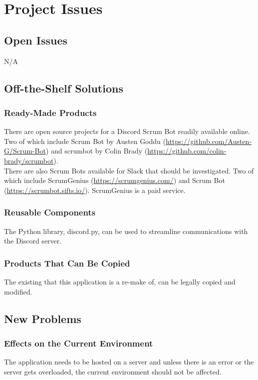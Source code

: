 \documentclass[12pt, titlepage]{article}
\begin{document}
\section{Project Issues}
\subsection{Open Issues}
N/A

\subsection{Off-the-Shelf Solutions}
\subsubsection{Ready-Made Products}
\noindent There are open source projects for a Discord Scrum Bot readily available online. Two of which include Scrum Bot by Austen Goddu (\url{https://github.com/Austen-G/Scrum-Bot}) and scrumbot by Colin Brady (\url{https://github.com/colin-brady/scrumbot}).\\

\noindent There are also Scrum Bots available for Slack that should be investigated. Two of which include ScrumGenius (\url{https://scrumgenius.com/}) and Scrum Bot (\url{https://scrumbot.sifts.io/}). ScrumGenius is a paid service.

\subsubsection{Reusable Components}
\noindent The Python library, discord.py, can be used to streamline communications with the Discord server.

\subsubsection{Products That Can Be Copied}
\noindent The existing that this application is a re-make of, can be legally copied and modified.

\subsection{New Problems}
\subsubsection{Effects on the Current Environment}
The application needs to be hosted on a server and unless there is an error or the server gets overloaded, the current environment should not be affected.
\end{document}
